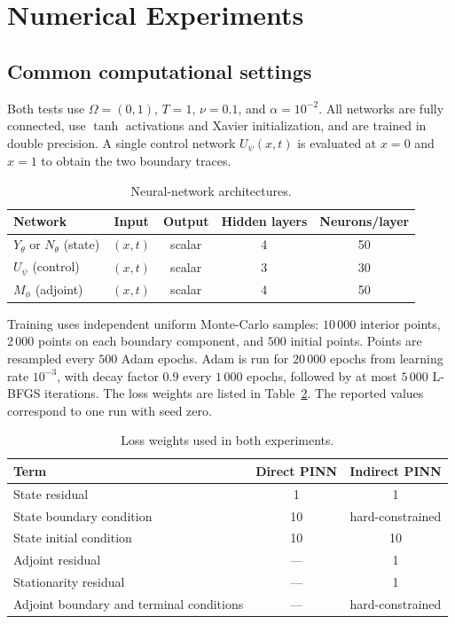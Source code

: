 \section{Numerical Experiments}

\subsection{Common computational settings}

Both tests use $\Omega=(0,1)$, $T=1$, $\nu=0.1$, and $\alpha=10^{-2}$. All networks are fully connected, use $\tanh$ activations and Xavier initialization, and are trained in double precision. A single control network $U_\psi(x,t)$ is evaluated at $x=0$ and $x=1$ to obtain the two boundary traces.

\begin{table}[H]
\centering
\caption{Neural-network architectures.}
\label{tab:architecture}
\begin{tabular}{lcccc}
\toprule
Network & Input & Output & Hidden layers & Neurons/layer\\
\midrule
$Y_\theta$ or $N_\theta$ (state) & $(x,t)$ & scalar & 4 & 50\\
$U_\psi$ (control) & $(x,t)$ & scalar & 3 & 30\\
$M_\phi$ (adjoint) & $(x,t)$ & scalar & 4 & 50\\
\bottomrule
\end{tabular}
\end{table}

Training uses independent uniform Monte-Carlo samples: $10\,000$ interior points, $2\,000$ points on each boundary component, and $500$ initial points. Points are resampled every $500$ Adam epochs. Adam is run for $20\,000$ epochs from learning rate $10^{-3}$, with decay factor $0.9$ every $1\,000$ epochs, followed by at most $5\,000$ L-BFGS iterations. The loss weights are listed in Table~\ref{tab:weights}. The reported values correspond to one run with seed zero.

\begin{table}[H]
\centering
\caption{Loss weights used in both experiments.}
\label{tab:weights}
\begin{tabular}{lcc}
\toprule
Term & Direct PINN & Indirect PINN\\
\midrule
State residual & 1 & 1\\
State boundary condition & 10 & hard-constrained\\
State initial condition & 10 & 10\\
Adjoint residual & --- & 1\\
Stationarity residual & --- & 1\\
Adjoint boundary and terminal conditions & --- & hard-constrained\\
\bottomrule
\end{tabular}
\end{table}

